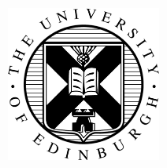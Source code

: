 \begin{titlepage}
	\begin{addmargin}[-1cm]{-3cm}
    \begin{center}
        \large  

        \hfill

        \vfill

        \begingroup
            \color{Maroon}\spacedallcaps{\myTitle} \\ \bigskip
        \endgroup

        \spacedlowsmallcaps{\myName}

        \vfill

        \includegraphics[width=4cm]{uoeMaterial/eushield-normal} \\ \medskip %
        \vfill

        \myDegree \\
        \myDepartment \\
        \myUni \\ \bigskip

        \myTime

        \vfill                      

    \end{center}  
  \end{addmargin}       
\end{titlepage}   
